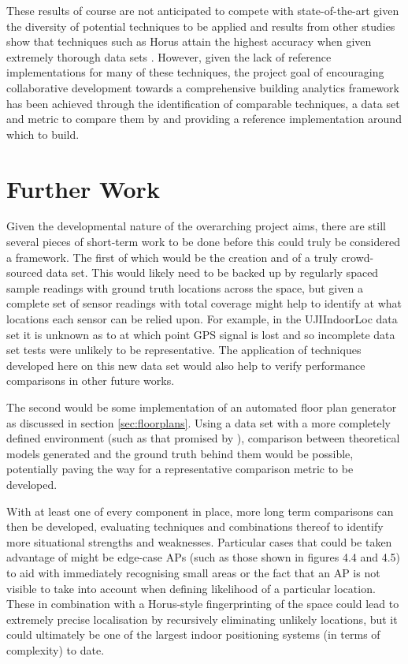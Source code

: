 \documentclass{UoYCSproject}
\begin{document}
        These results of course are not anticipated to compete with state-of-the-art given the diversity of potential techniques to be applied and results from other studies show that techniques such as Horus attain the highest accuracy when given extremely thorough data sets \cite{youssef2005horus}. However, given the lack of reference implementations for many of these techniques, the project goal of encouraging collaborative development towards a comprehensive building analytics framework has been achieved through the identification of comparable techniques, a data set and metric to compare them by and providing a reference implementation around which to build.
	    
	    \section{Further Work}
        
            Given the developmental nature of the overarching project aims, there are still several pieces of short-term work to be done before this could truly be considered a framework. The first of which would be the creation and of a truly crowd-sourced data set. This would likely need to be backed up by regularly spaced sample readings with ground truth locations across the space, but given a complete set of sensor readings with total coverage might help to identify at what locations each sensor can be relied upon. For example, in the UJIIndoorLoc data set it is unknown as to at which point GPS signal is lost and so incomplete data set tests were unlikely to be representative. The application of techniques developed here on this new data set would also help to verify performance comparisons in other future works.
            
            The second would be some implementation of an automated floor plan generator as discussed in section \ref{sec:floorplans}. Using a data set with a more completely defined environment (such as that promised by \citet{JoaquinEmail}), comparison between theoretical models generated and the ground truth behind them would be possible, potentially paving the way for a representative comparison metric to be developed.
            
            With at least one of every component in place, more long term comparisons can then be developed, evaluating techniques and combinations thereof to identify more situational strengths and weaknesses. Particular cases that could be taken advantage of might be edge-case APs (such as those shown in figures 4.4 and 4.5) to aid with immediately recognising small areas or the fact that an AP is not visible to take into account when defining likelihood of a particular location. These in combination with a Horus-style fingerprinting of the space could lead to extremely precise localisation by recursively eliminating unlikely locations, but it could ultimately be one of the largest indoor positioning systems (in terms of complexity) to date.
\end{document}

